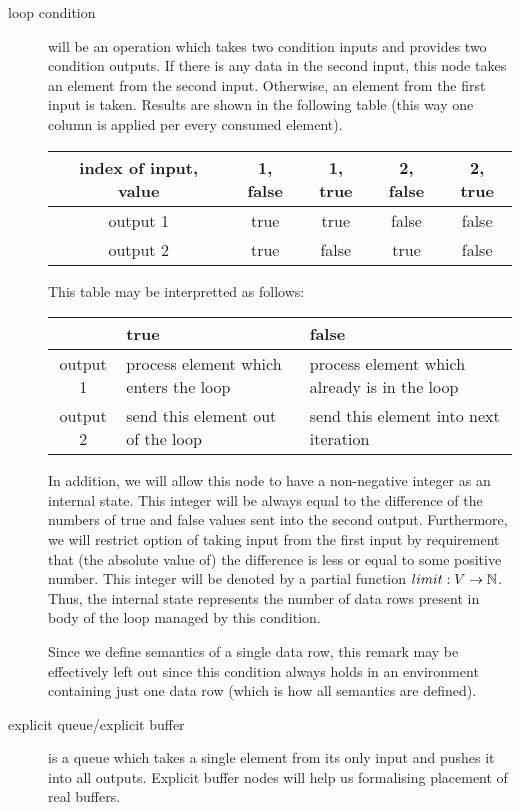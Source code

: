 \begin{description}
  \item [loop condition] will be an operation which takes two condition inputs and provides two condition outputs. If there is any data in the second input, this node takes an element from the second input. Otherwise, an element from the first input is taken. Results are shown in the following table (this way one column is applied per every consumed element).
    \begin{center}
      \begin{tabular}{c|c|c|c|c}
        index of input, value & 1, false & 1, true & 2, false & 2, true \\ \hline
        output 1  & true            & true           & false           & false          \\ \hline
        output 2  & true            & false          & true            & false          \\ 
      \end{tabular}
    \end{center}
    This table may be interpretted as follows:
    \begin{center}
      \begin{tabular}{c|p{4cm}|p{4cm}}
        & true            & false \\ \hline
        output 1  & process element which enters the loop & process element which already is in the loop \\ \hline
        output 2  & send this element out of the loop & send this element into next iteration \\ 
      \end{tabular}
    \end{center}
      In addition, we will allow this node to have a non-negative integer as an internal state. This integer will be always equal to the difference of the numbers of true and false values sent into the second output. Furthermore, we will restrict option of taking input from the first input by requirement that (the absolute value of) the difference is less or equal to some positive number. This integer will be denoted by a partial function $limit: V \rightarrow \mathbb{N}$. Thus, the internal state represents the number of data rows present in body of the loop managed by this condition. 
      
      Since we define semantics of a single data row, this remark may be effectively left out since this condition always holds in an environment containing just one data row (which is how all semantics are defined). 

  \item [explicit queue/explicit buffer] is a queue which takes a single element from its only input and pushes it into all outputs. Explicit buffer nodes will help us formalising placement of real buffers. 
\end{description}
\myenddef

